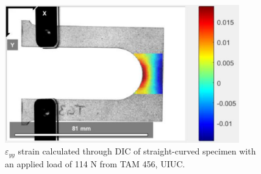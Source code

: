 \begin{figure}[!h]
\centering
\includegraphics[angle=0, width=4in]{Strain-Figures/dic2.png}
\vspace{-2mm}
\caption{\small $\varepsilon_{yy}$ strain calculated through DIC of straight-curved specimen with an applied load of 114 N from TAM 456, UIUC.}
\vspace{-3mm}
\label{Fig:dic2}
\end{figure}

